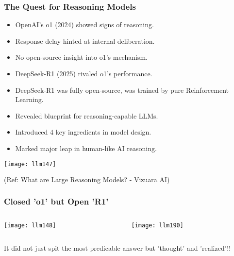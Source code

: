\begin{frame}[fragile]\frametitle{The Quest for Reasoning Models}

		\begin{itemize}
		  \item OpenAI’s o1 (2024) showed signs of reasoning.
		  \item Response delay hinted at internal deliberation.
		  \item No open-source insight into o1’s mechanism.
		  \item DeepSeek-R1 (2025) rivaled o1’s performance.
		  \item DeepSeek-R1 was fully open-source, was trained by pure Reinforcement Learning.
		  \item Revealed blueprint for reasoning-capable LLMs.
		  \item Introduced 4 key ingredients in model design.
		  \item Marked major leap in human-like AI reasoning.
		\end{itemize}

		\begin{center}
		\texttt{[image: llm147]}
		
		{\tiny (Ref: What are Large Reasoning Models? - Vizuara AI)}
		
		\end{center}

\end{frame}

\begin{frame}[fragile]\frametitle{Closed 'o1' but Open 'R1'}

\begin{columns}
    \begin{column}[T]{0.5\linewidth}
		\begin{center}
		\texttt{[image: llm148]}		
		\end{center}
    \end{column}
    \begin{column}[T]{0.5\linewidth}	
		\begin{center}
		\texttt{[image: llm190]}
		\end{center}	
    \end{column}
  \end{columns}


It did not just spit the most predicable answer but 'thought' and 'realized'!!
\end{frame}


